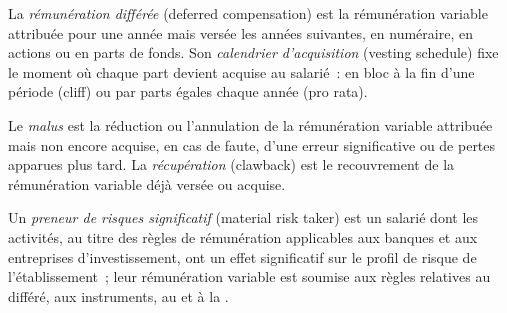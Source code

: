 \begin{definition}\label{def:fm:hiring-and-compensation:deferral}
La \emph{rémunération différée} (deferred compensation) est la rémunération variable attribuée pour une année mais versée les années suivantes, en numéraire, en actions ou en parts de
fonds. Son \emph{calendrier d'acquisition} (vesting schedule) fixe le moment où chaque part devient acquise au salarié~: en bloc à la fin d'une période (cliff) ou
par parts égales chaque année (pro rata).
\end{definition}

\begin{definition}\label{def:fm:hiring-and-compensation:malus}
Le \emph{malus} est la réduction ou l'annulation de la rémunération variable attribuée mais non encore acquise, en cas de faute, d'une erreur significative
ou de pertes apparues plus tard. La \emph{récupération} (clawback) est le recouvrement de la rémunération variable déjà versée ou
acquise.
\end{definition}

\begin{definition}\label{def:fm:hiring-and-compensation:mrt}
Un \emph{preneur de risques significatif} (material risk taker) est un salarié dont les activités, au titre des règles de rémunération applicables aux banques et aux entreprises d'investissement,
ont un effet significatif sur le profil de risque de l'établissement~; leur rémunération variable est soumise aux règles relatives au différé, aux instruments, au  et
à la .
\end{definition}

